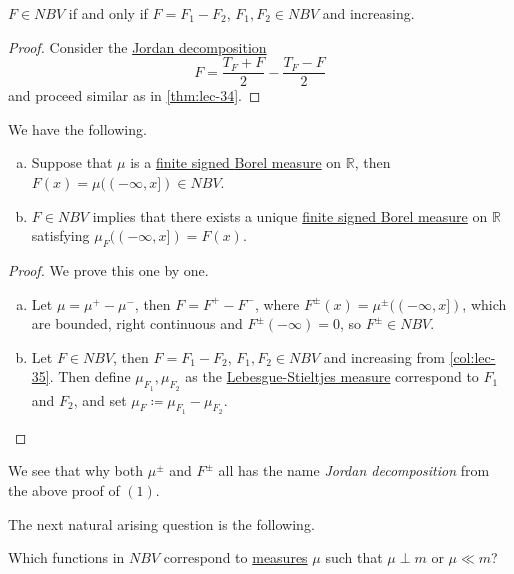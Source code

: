 \begin{corollary}\label{col:lec-35}
	\(F \in NBV\) if and only if \(F = F_1 - F_2\), \(F_1,F_2 \in NBV\) and increasing.
\end{corollary}
\begin{proof}
	Consider the \hyperref[def:Jordan-decomposition]{Jordan decomposition}
	\[
		F = \frac{T_{F} +F}{2} - \frac{T_{F} - F}{2}
	\]
	and proceed similar as in \autoref{thm:lec-34}.
\end{proof}

\begin{theorem}\label{thm:nbv-measures}
	We have the following.
	\begin{enumerate}[(a)]
		\item Suppose that \(\mu\) is a \hyperref[def:finite-signed-measure]{finite signed \hyperref[def:Borel-measure]{Borel measure}}
		      on \(\mathbb{R}\), then \(F(x) = \mu((-\infty, x]) \in NBV\).
		\item \(F \in NBV\) implies that there exists a unique \hyperref[def:finite-signed-measure]{finite signed \hyperref[def:Borel-measure]{Borel measure}}
		      on \(\mathbb{R}\) satisfying \(\mu_F((-\infty,x]) = F(x)\).
	\end{enumerate}
\end{theorem}
\begin{proof}
	We prove this one by one.
	\begin{enumerate}[(a)]
		\item Let \(\mu = \mu^+ - \mu^-\), then \(F = F^+ - F^-\), where \(F^{\pm}(x) = \mu^{\pm}((-\infty,x])\), which are bounded,
		      right continuous and \(F^{\pm}(-\infty) = 0\), so \(F^{\pm} \in NBV\).
		\item Let \(F \in NBV\), then \(F = F_1 - F_2\), \(F_1,F_2 \in NBV\) and increasing from \autoref{col:lec-35}. Then define \(\mu_{F_1},\mu_{F_2}\) as the
		      \hyperref[def:Lebesgue-Stieltjes-measure]{Lebesgue-Stieltjes measure} correspond to \(F_1\) and \(F_2\), and set
		      \(\mu_F \coloneqq \mu_{F_1} - \mu_{F_2}\).
	\end{enumerate}
\end{proof}
\begin{remark}
	We see that why both \(\mu ^\pm\) and \(F^\pm\) all has the name \emph{Jordan decomposition} from the above proof of \((1)\).
\end{remark}

The next natural arising question is the following.
\begin{problem}
Which functions in \(NBV\) correspond to \hyperref[def:measure]{measures} \(\mu\) such that \(\mu \perp m\) or \(\mu \ll m\)?
\end{problem}

